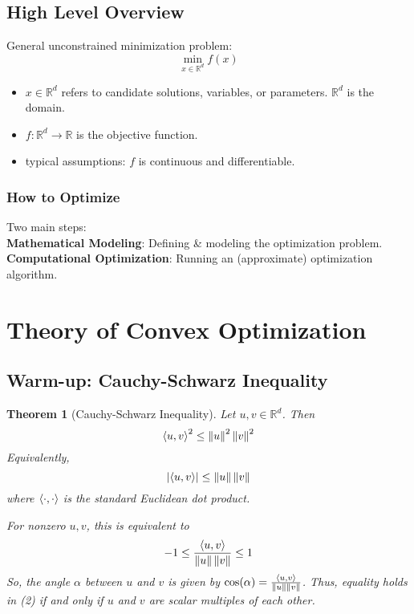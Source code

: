 \documentclass[10pt]{article}
\newcommand{\abs}[1]{\left\lvert#1\right\rvert}   					%
\newcommand{\norm}[1]{\left\lVert#1\right\rVert}					%
\newcommand{\R}{\mathbb{R}}
\newtheorem{theorem}{Theorem}[section]
\theoremstyle{remark}
\theoremstyle{definition}
\begin{document}
	



\subsection{High Level Overview}
General unconstrained minimization problem:
\begin{equation}
	\min_{x \in \R^d} f(x)
\end{equation} 
\begin{itemize}
	\item $x \in \R^d$ refers to candidate solutions, variables, or parameters. $\R^d$ is the domain.
	\item $f: \R^d \to \R$ is the objective function.
	\item typical assumptions: $f$ is continuous and differentiable.
\end{itemize}

\subsubsection{How to Optimize}
Two main steps:\\
\textbf{Mathematical Modeling}: Defining \& modeling the optimization problem.\\
\textbf{Computational Optimization}: Running an (approximate) optimization algorithm.

\section{Theory of Convex Optimization}
\subsection{Warm-up: Cauchy-Schwarz Inequality}
\begin{theorem}[Cauchy-Schwarz Inequality]
	Let $u, v \in \R^d$. Then 
	\begin{equation}
		\innerprod{u}{v}^2 \leq \norm{u}^2 \norm{v}^2
	\end{equation}
	Equivalently, 
	\begin{equation}
		\abs{\innerprod{u}{v}} \leq \norm{u} \norm{v}
	\end{equation}
	\noindent where $\left\langle \cdot, \cdot \right\rangle$ is the standard Euclidean dot product. 

	For nonzero $u,v$, this is equivalent to 
	\begin{equation}
		-1 \leq \frac{\innerprod{u}{v}}{\norm{u} \norm{v}} \leq 1
	\end{equation}
	So, the angle $\alpha$ between $u$ and $v$ is given by $\cos(\alpha) = \frac{\innerprod{u}{v}}{\norm{u} \norm{v}}$.
	Thus, equality holds in (2) if and only if $u$ and $v$ are scalar multiples of each other.
\end{theorem}
\end{document}
